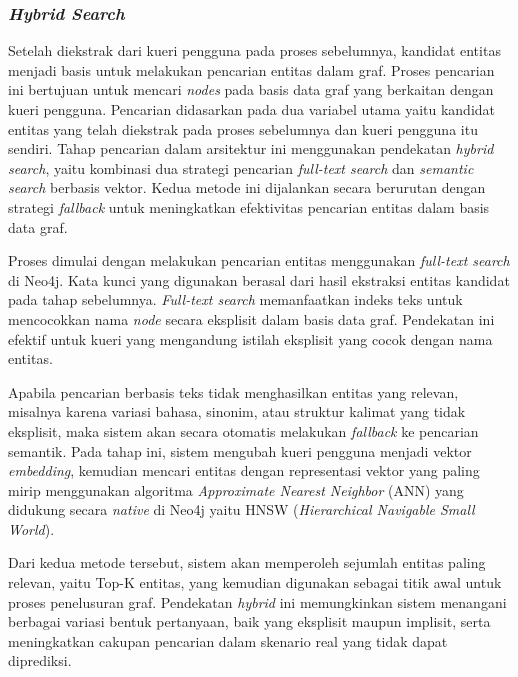 \subsubsection{\textit{Hybrid Search}}
Setelah diekstrak dari kueri pengguna pada proses sebelumnya, kandidat entitas menjadi basis untuk melakukan pencarian entitas dalam graf.
Proses pencarian ini bertujuan untuk mencari \textit{nodes} pada basis data graf yang berkaitan dengan kueri pengguna.
Pencarian didasarkan pada dua variabel utama yaitu kandidat entitas yang telah diekstrak pada proses sebelumnya dan kueri pengguna itu sendiri.
Tahap pencarian dalam arsitektur ini menggunakan pendekatan \textit{hybrid search}, yaitu kombinasi dua strategi pencarian \textit{full-text search} dan \textit{semantic search} berbasis vektor.
Kedua metode ini dijalankan secara berurutan dengan strategi \textit{fallback} untuk meningkatkan efektivitas pencarian entitas dalam basis data graf.

Proses dimulai dengan melakukan pencarian entitas menggunakan \textit{full-text search} di Neo4j.
Kata kunci yang digunakan berasal dari hasil ekstraksi entitas kandidat pada tahap sebelumnya.
\textit{Full-text search} memanfaatkan indeks teks untuk mencocokkan nama \textit{node} secara eksplisit dalam basis data graf.
Pendekatan ini efektif untuk kueri yang mengandung istilah eksplisit yang cocok dengan nama entitas.

Apabila pencarian berbasis teks tidak menghasilkan entitas yang relevan, misalnya karena variasi bahasa, sinonim, atau struktur kalimat yang tidak eksplisit, maka sistem akan secara otomatis melakukan \textit{fallback} ke pencarian semantik.
Pada tahap ini, sistem mengubah kueri pengguna menjadi vektor \textit{embedding}, kemudian mencari entitas dengan representasi vektor yang paling mirip menggunakan algoritma \textit{Approximate Nearest Neighbor} (ANN) yang didukung secara \textit{native} di Neo4j yaitu HNSW (\textit{Hierarchical Navigable Small World}).

Dari kedua metode tersebut, sistem akan memperoleh sejumlah entitas paling relevan, yaitu Top-K entitas, yang kemudian digunakan sebagai titik awal untuk proses penelusuran graf.
Pendekatan \textit{hybrid} ini memungkinkan sistem menangani berbagai variasi bentuk pertanyaan, baik yang eksplisit maupun implisit, serta meningkatkan cakupan pencarian dalam skenario real yang tidak dapat diprediksi.

